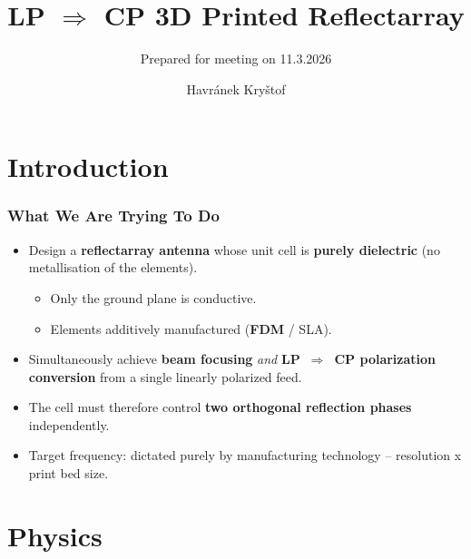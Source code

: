 \documentclass[aspectratio=43]{beamer}
\title{LP $\Rightarrow$ CP 3D Printed Reflectarray}
\subtitle{Prepared for meeting on 11.3.2026}
\author{Havránek Kryštof}
\date{}
\institute{CTU, NTUST}
\begin{document}
\begin{frame}[plain]
  \maketitle
\end{frame}

\clearpage
\setcounter{framenumber}{0}

\section{Introduction}
\begin{frame}[fragile]
  \frametitle{What We Are Trying To Do}
  \begin{itemize}
    \item Design a \textbf{reflectarray antenna} whose unit cell is
      \textbf{purely dielectric} (no metallisation of the elements).
      \begin{itemize}
        \item Only the ground plane is conductive.
        \item Elements additively manufactured (\textbf{FDM} / SLA).
      \end{itemize}
    \item Simultaneously achieve \textbf{beam focusing} \emph{and}
      \textbf{LP~$\Rightarrow$~CP polarization conversion} from a single
      linearly polarized feed.
    \item The cell must therefore control \textbf{two orthogonal reflection
        phases} independently.
    \item Target frequency: dictated purely by manufacturing technology -- resolution x print bed size.
  \end{itemize}
\end{frame}

\section{Physics}
\end{document}
